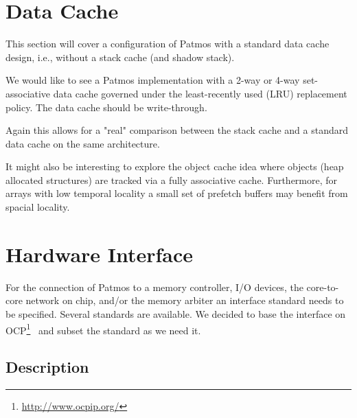 \documentclass[a4paper,fontsize=10pt,twoside,DIV15,BCOR12mm,headinclude=true,footinclude=false,pagesize,bibtotoc]{scrbook}
\newcommand{\comment}[3]{

\textsf{\textbf{#1}} {\color{#3}#2}}
\newcommand{\martin}[1]{\comment{Martin}{#1}{Blue}}
\newcommand{\fb}[1]{\comment{Florian}{#1}{Emerald}}
\renewcommand{\martin}[1]{}
\renewcommand{\fb}[1]{}
\begin{document}
\fb{For a reasonable comparison we still need a reasonable baseline for the
method cache. Please add a section on the standard instruction cache design,
issues you would like to see addressed there, and potential amendments to the
ISA with respect to the current proposal with a method cache. Thanks!}

\martin{Agreed that comparison between FIFO M\$ and plain I\$ is one of
the project goals. However, before doing the HW support for both I would
like to see the comparison within the WCET analysis. I think there is an
empty paper start here in this SVN under 2012/mceval/mceval.tex ;-)}

\section{Data Cache}

This section will cover a configuration of Patmos with a standard data cache design, i.e., without a stack cache (and shadow stack).

We would like to see a Patmos implementation with a 2-way or 4-way set-associative data cache governed under the least-recently used (LRU) replacement policy.
The data cache should be write-through.

Again this allows for a "real" comparison between the stack cache and a standard data cache on the same architecture.

It might also be interesting to explore the object cache idea \cite{jop:ocache, jop:ocwcet:ccpe} where objects (heap allocated structures) are tracked via
a fully associative cache. Furthermore, for arrays with low temporal locality
a small set of prefetch buffers may benefit from spacial locality.

\section{Hardware Interface}

For the connection of Patmos to a memory controller, I/O devices, the
core-to-core network on chip, and/or the memory arbiter an interface
standard needs to be specified. Several standards are available.  We
decided to base the interface on
OCP\footnote{\url{http://www.ocpip.org/}}~\cite{ocp:spec} and subset
the standard as we need it.

\subsection{Description}
\end{document}
